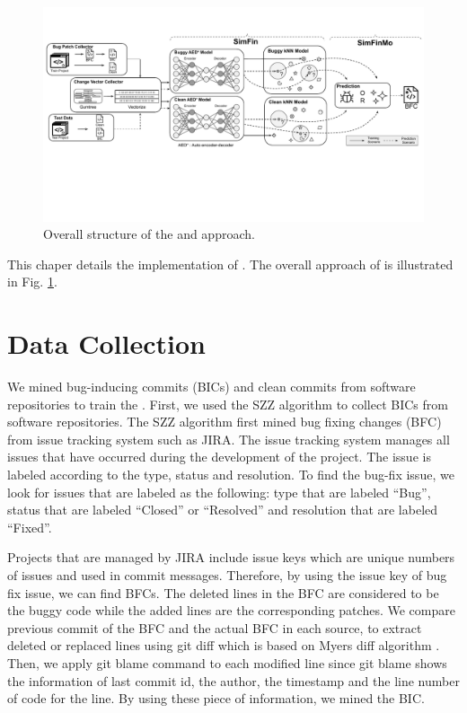 \begin{figure}[!tbp]
\renewcommand{\arraystretch}{1}
    \centering
    \includegraphics[width=\textwidth]{figures/approach_fig.pdf}\hfill
    \caption{Overall structure of the {\simfin} and {\simfinmo} approach.}
    \label{fig:approach}
\end{figure}
    
     

This chaper details the implementation of {\simfinmo}.
The overall approach of {\simfinmo} is illustrated in Fig. \ref{fig:approach}.

\section{Data Collection}
We mined bug-inducing commits (BICs) and clean commits from software repositories to train the {\simfin}.
First, we used the SZZ algorithm \cite{sliwerski2005changes} to collect BICs from software repositories. 
The SZZ algorithm first mined bug fixing changes (BFC) from issue tracking system such as JIRA.
The issue tracking system manages all issues that have occurred during the development of the project.
The issue is labeled according to the type, status and resolution.
To find the bug-fix issue, we look for issues that are labeled as the following: type that are labeled ``Bug'', status that are labeled ``Closed'' or ``Resolved'' and resolution that are labeled ``Fixed''.

Projects that are managed by JIRA include issue keys which are unique numbers of issues and used in commit messages.
Therefore, by using the issue key of bug fix issue, we can find BFCs.
The deleted lines in the BFC are considered to be the buggy code while the added lines are the corresponding patches.
We compare previous commit of the BFC and the actual BFC in each source, to extract deleted or replaced lines using git diff which is based on Myers diff algorithm \cite{myers1986ano}.
Then, we apply git blame command to each modified line since git blame shows the information of last commit id, the author, the timestamp and the line number of code for the line.
By using these piece of information, we mined the BIC.

